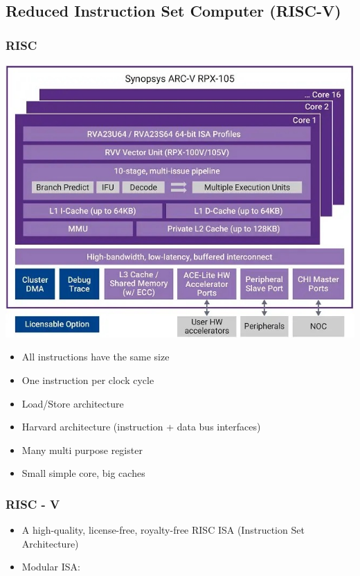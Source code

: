 \documentclass[
  10pt,
  a4paper,
]{article}
\providecommand{\tightlist}{%
  \setlength{\itemsep}{0pt}\setlength{\parskip}{0pt}}\usepackage{longtable,booktabs,array}
\begin{document}
\begin{multicols*}{2}
\begin{tcolorbox}
\end{tcolorbox}

\subsection{Reduced Instruction Set Computer
(RISC-V)}\label{reduced-instruction-set-computer-risc-v}

\subsubsection{RISC}\label{risc}

\includegraphics{images/performance/image-10.png}

\begin{itemize}
\tightlist
\item
  All instructions have the same size
\item
  One instruction per clock cycle
\item
  Load/Store architecture
\item
  Harvard architecture (instruction + data bus interfaces)
\item
  Many multi purpose register
\item
  Small simple core, big caches
\end{itemize}

\subsubsection{RISC - V}\label{risc---v}

\begin{itemize}
\tightlist
\item
  A high-quality, license-free, royalty-free RISC ISA (Instruction Set
  Architecture)
\item
  Modular ISA:


\end{itemize}
\end{multicols*}
\end{document}
